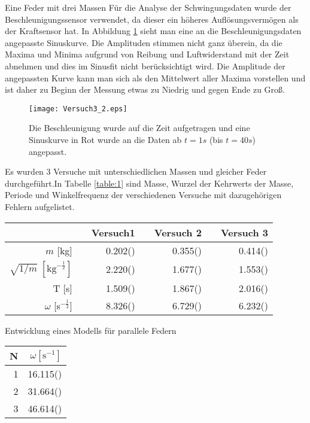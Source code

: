 \documentclass{alex_gp}
\begin{document}
\begin{mybox}{Eine Feder mit drei Massen}
	Für die Analyse der Schwingungsdaten wurde der Beschleunigungssensor verwendet, da dieser ein höheres Auflösungsvermögen als der Kraftsensor hat. In Abbildung \ref{fig:sine} sieht man eine an die Beschleunigungsdaten angepasste Sinuskurve. Die Amplituden stimmen nicht ganz überein, da die Maxima und Minima aufgrund von Reibung und Luftwiderstand mit der Zeit abnehmen und dies im Sinusfit nicht berücksichtigt wird. Die Amplitude der angepassten Kurve kann man sich als den Mittelwert aller Maxima vorstellen und ist daher zu Beginn der Messung etwas zu Niedrig und gegen Ende zu Groß.
	
	\begin{figure}[H]
		\vspace{-1cm}		
		\centering
		\texttt{[image: Versuch3\_2.eps]}
		\caption{Die Beschleunigung wurde auf die Zeit aufgetragen und eine Sinuskurve in Rot wurde an die Daten ab \( t = 1 \unit{s} \) (bis \( t = 40 \unit{s} \)) angepasst.}
		\label{fig:sine}
	\end{figure}
	
	Es wurden 3 Versuche mit unterschiedlichen Massen und gleicher Feder durchgeführt.In Tabelle \ref{table:1} sind Masse, Wurzel der Kehrwerts der Masse, Periode und Winkelfrequenz der verschiedenen Versuche mit dazugehörigen Fehlern aufgelistet. \par
	\centering
	\begin{tabular}{@{}r c r c r c r @{}}\toprule
		&& Versuch1 && Versuch 2 && Versuch 3 \\ \midrule
		\( m \) [kg] && 0.202() && 0.355() && 0.414() \\
		\( \sqrt{1/m}\; [\text{kg}^{-\tfrac{1}{2}}] \) && 2.220() && 1.677() && 1.553() \\
		T [s] && 1.509() && 1.867() && 2.016() \\
		$\omega$ [s\( ^{-\tfrac{1}{2}} \)] && 8.326() && 6.729() && 6.232() \\
		\bottomrule
	\end{tabular}
	\label{table:1}
	
	
\end{mybox}

\begin{mybox}{Entwicklung eines Modells für parallele Federn}
	\begin{tabular}{@{}r | r @{}}\toprule
		N & \( \omega [\text{s}^{-1}]\) \\ \midrule
		1 & 16.115() \\
		2 & 31.664() \\
		3 & 46.614() \\
		\bottomrule
	\end{tabular}
\end{mybox}

\begin{mybox}{}

\end{mybox}
\end{document}
